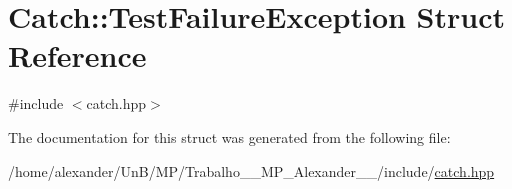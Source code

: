 \hypertarget{structCatch_1_1TestFailureException}{\section{Catch\-:\-:Test\-Failure\-Exception Struct Reference}
\label{structCatch_1_1TestFailureException}
}


{\ttfamily \#include $<$catch.\-hpp$>$}



The documentation for this struct was generated from the following file\-:\begin{DoxyCompactItemize}
\item 
/home/alexander/\-Un\-B/\-M\-P/\-Trabalho\-\_\-\_\-\-M\-P\-\_\-\-Alexander\-\_\-\_/include/\hyperlink{catch_8hpp}{catch.\-hpp}\end{DoxyCompactItemize}
